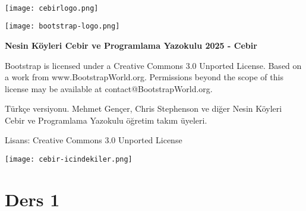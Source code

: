 \documentclass[12pt, a4paper]{article}
\begin{document}
\setcounter{page}{1}
\\
\vspace*{0.8cm}
\begin{center}
\texttt{[image: cebirlogo.png]}

\texttt{[image: bootstrap-logo.png]}
 
\end{center}

\vspace*{0.2cm}


\begin{center}
{\Large \bf{Nesin Köyleri Cebir ve Programlama Yazokulu 2025 - Cebir}}

{\tiny Bootstrap is licensed under a Creative Commons 3.0 Unported License. Based on a work from
www.BootstrapWorld.org. Permissions beyond the scope of this license may be available at
contact@BootstrapWorld.org.

Türkçe versiyonu. Mehmet Gençer, Chris Stephenson ve diğer Nesin Köyleri Cebir ve Programlama Yazokulu öğretim takım üyeleri.

Lisans: Creative Commons 3.0 Unported License} 
\end{center}

\newpage
\texttt{[image: cebir-icindekiler.png]}
\newpage
\section*{Ders 1}
\end{document}
